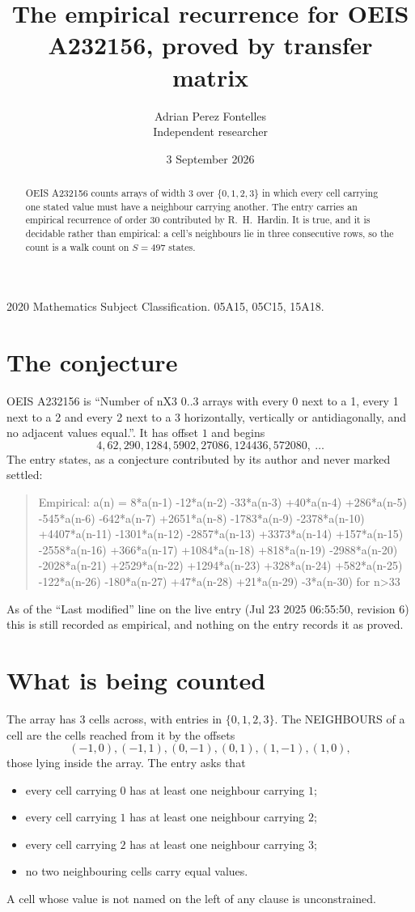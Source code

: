 \documentclass[11pt,a4paper]{article}
\title{The empirical recurrence for OEIS A232156, proved by transfer matrix}
\author{Adrian Perez Fontelles\\ \small Independent researcher}
\date{3 September 2026}
\theoremstyle{plain}
\theoremstyle{definition}
\begin{document}
\maketitle

\begin{abstract}
OEIS A232156 counts arrays of width $3$ over $\{0,1,2,3\}$ in which every cell carrying one stated
value must have a neighbour carrying another. The entry carries an empirical recurrence of
order $30$ contributed by R.~H.~Hardin. It is true, and it is decidable rather than
empirical: a cell's neighbours lie in three consecutive rows, so the count is a walk count on
$S=497$ states.
\end{abstract}

\noindent\small 2020 Mathematics Subject Classification. 05A15, 05C15, 15A18.\normalsize

\section{The conjecture}

OEIS A232156 is ``Number of nX3 0..3 arrays with every 0 next to a 1, every 1 next to a 2 and every 2 next to a 3 horizontally, vertically or antidiagonally, and no adjacent values equal.''. It has offset $1$ and begins
\[
4, 62, 290, 1284, 5902, 27086, 124436, 572080,\ \dots
\]
The entry states, as a conjecture contributed by its author and never marked settled:
\begin{quote}
Empirical: a(n) = 8*a(n-1) -12*a(n-2) -33*a(n-3) +40*a(n-4) +286*a(n-5) -545*a(n-6) -642*a(n-7) +2651*a(n-8) -1783*a(n-9) -2378*a(n-10) +4407*a(n-11) -1301*a(n-12) -2857*a(n-13) +3373*a(n-14) +157*a(n-15) -2558*a(n-16) +366*a(n-17) +1084*a(n-18) +818*a(n-19) -2988*a(n-20) -2028*a(n-21) +2529*a(n-22) +1294*a(n-23) +328*a(n-24) +582*a(n-25) -122*a(n-26) -180*a(n-27) +47*a(n-28) +21*a(n-29) -3*a(n-30) for n>33
\end{quote}
As of the ``Last modified'' line on the live entry (Jul 23 2025 06:55:50, revision 6) this is still
recorded as empirical, and nothing on the entry records it as proved.

\section{What is being counted}

The array has $3$ cells across, with entries in $\{0,1,2,3\}$. The NEIGHBOURS of a cell are the
cells reached from it by the offsets
\[
(-1,0), (-1,1), (0,-1), (0,1), (1,-1), (1,0),
\]
those lying inside the array. The entry asks that
\begin{itemize}
\item every cell carrying $0$ has at least one neighbour carrying $1$;
\item every cell carrying $1$ has at least one neighbour carrying $2$;
\item every cell carrying $2$ has at least one neighbour carrying $3$;
\item no two neighbouring cells carry equal values.
\end{itemize}
A cell whose value is not named on the left of any clause is unconstrained.
\end{document}
